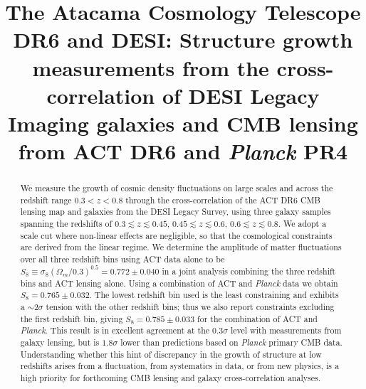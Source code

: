 \documentclass[twocolumn]{aastex631}
\def\YC#1{{\color{purple}#1}}
\begin{document}
\title{The Atacama Cosmology Telescope DR6 and DESI: Structure growth measurements from the cross-correlation of DESI Legacy Imaging galaxies and CMB lensing from ACT DR6 and \textit{Planck} PR4}







\begin{abstract}
We measure the growth of cosmic density fluctuations on large scales and across the redshift range $0.3<z<0.8$ through the cross-correlation of the ACT DR6 CMB lensing map and galaxies from the DESI Legacy Survey, using three galaxy samples spanning the redshifts of $0.3 \lesssim z  \lesssim 0.45$, $0.45  \lesssim z  \lesssim0.6$, $0.6 \lesssim z  \lesssim 0.8$. We adopt a scale cut where non-linear effects are negligible, so that the cosmological constraints are derived from the linear regime. We determine the amplitude of matter fluctuations over all three redshift bins using ACT data alone to be $S_8\equiv\sigma_8(\Omega_m/0.3)^{0.5}=0.772\pm0.040$ in a joint analysis combining the three redshift bins and  ACT lensing alone. Using a combination of ACT and \textit{Planck} data we obtain $S_8=0.765\pm0.032$. The lowest redshift bin used is the least constraining and exhibits a $\sim2\sigma$ tension with the other redshift bins; thus
we also report constraints excluding the first redshift bin, giving $S_8=0.785\pm0.033$ for the combination of ACT and \textit{Planck}.
This result is in excellent agreement at the $0.3\sigma$ level with measurements from galaxy lensing, but is $1.8\sigma$ lower than predictions based on \textit{Planck} primary CMB data. 
Understanding whether this hint of discrepancy in the growth of structure at low redshifts arises from a fluctuation, from systematics in data, or from new physics, is a high priority for forthcoming CMB lensing and galaxy cross-correlation analyses.



\end{abstract}
\end{document}

